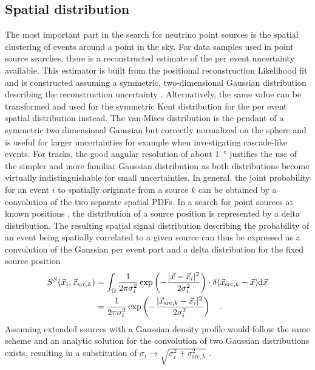 \subsection{Spatial distribution}
The most important part in the search for neutrino point sources is the spatial clustering of events around a point in the sky.
For data samples used in point source searches, there is a reconstructed estimate of the per event uncertainty available.
This estimator is built from the positional reconstruction Likelihood fit and is constructed assuming a symmetric, two-dimensional Gaussian distribution describing the reconstruction uncertainty .
Alternatively, the same value can be transformed and used for the symmetric Kent distribution  for the per event spatial distribution instead.
The van-Mises distribution is the pendant of a symmetric two dimensional Gaussian but correctly normalized on the sphere and is useful for larger uncertainties for example when investigating cascade-like events.
For tracks, the good angular resolution of about \SI{1}{\degree} justifies the use of the simpler and more familiar Gaussian distribution as both distributions become virtually indistinguishable for small uncertainties.
In general, the joint probability for an event $i$ to spatially originate from a source $k$ can be obtained by a convolution of the two separate spatial PDFs.
In a search for point sources at known positions , the distribution of a source position is represented by a delta distribution.
The resulting spatial signal distribution describing the probability of an event being spatially correlated to a given source can thus be expressed as a convolution of the Gaussian per event part and a delta distribution for the fixed source position
\begin{equation}
  \begin{aligned}
    S^S(\vec{x}_i, \vec{x}_{\mathrm{src},k}) &=
      \int_\Omega \frac{1}{2\pi \sigma_i^2}
      \exp\left(-\frac{|\vec{x}-\vec{x}_i|^2}{2\sigma_i^2}\right) \cdot
      \delta(\vec{x}_{\mathrm{src},k} - \vec{x}) \mathrm{d}\vec{x} \\
      &= \frac{1}{2\pi \sigma_i^2}
         \exp\left(-\frac{|\vec{x}_{\mathrm{src},k}-
                          \vec{x}_i|^2}{2\sigma_i^2}\right)
      \quad\text{.}
  \end{aligned}
\end{equation}
Assuming extended sources with a Gaussian density profile would follow the same scheme and an analytic solution for the convolution of two Gaussian distributions exists, resulting in a substitution of $\sigma_i \rightarrow \sqrt{\sigma_i^2 + \sigma_{\text{src},k}^2}$ .

